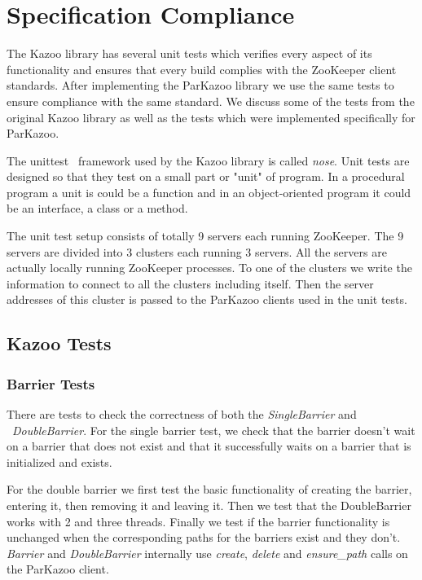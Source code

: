 \chapter{Specification Compliance}

The Kazoo library has several unit tests which verifies every aspect of its functionality and ensures that every build complies with the ZooKeeper client standards. After implementing the ParKazoo library we use the same tests to ensure compliance with the same standard. We discuss some of the tests from the original Kazoo library as well as the tests which were implemented specifically for ParKazoo.

The unittest~\cite{hamill2004unit} framework used by the Kazoo library is called \textit{nose}. Unit tests are designed so that they test on a small part or "unit" of program. In a procedural program a unit is could be a function and in an object-oriented program it could be an interface, a class or a method.

The unit test setup consists of totally 9 servers each running ZooKeeper. The 9 servers are divided into 3 clusters each running 3 servers. All the servers are actually locally running ZooKeeper processes. To one of the clusters we write the information to connect to all the clusters including itself. Then the server addresses of this cluster is passed to the ParKazoo clients used in the unit tests. 

\section{Kazoo Tests}

\subsection{Barrier Tests}
There are tests to check the correctness of both the \textit{SingleBarrier} and ~\textit{DoubleBarrier}. For the single barrier test, we check that the barrier doesn't wait on a barrier that does not exist and that it successfully waits on a barrier that is initialized and exists.

For the double barrier we first test the basic functionality of creating the barrier, entering it, then removing it and leaving it. Then we test that the DoubleBarrier works with 2 and three threads. Finally we test if the barrier functionality is unchanged when the corresponding paths for the barriers exist and they don't. \textit{Barrier} and \textit{DoubleBarrier} internally use \textit{create}, \textit{delete} and \textit{ensure\_path} calls on the ParKazoo client.

